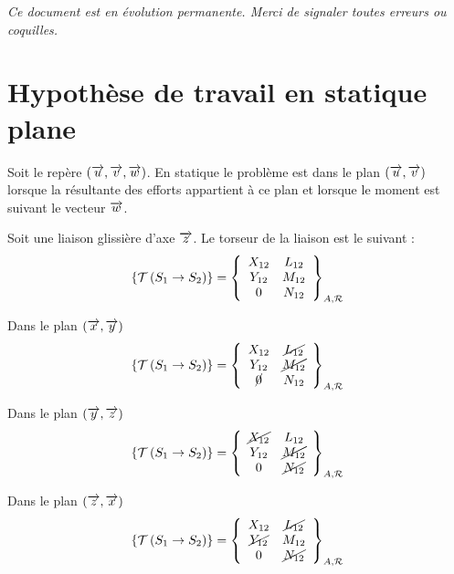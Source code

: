 \documentclass[10pt]{article}
\begin{document}
\setlength{\parskip}{0ex plus 0.2ex minus 0ex}
 \renewcommand{\contentsname}{}
 \renewcommand{\baselinestretch}{1}

\tableofcontents

 \renewcommand{\baselinestretch}{1.2}
\setlength{\parskip}{2ex plus 0.5ex minus 0.2ex}

\textit{Ce document est en évolution permanente. Merci de signaler toutes
erreurs ou coquilles.}

\section{Hypothèse de travail en statique plane}
\begin{defi}
Soit le repère $(\vect{u},\vect{v},\vect{w})$. En statique le problème est dans le plan $(\vect{u},\vect{v})$ lorsque la résultante des efforts appartient à ce plan et lorsque le moment est suivant le vecteur $\vect{w}$.
\end{defi}

\begin{exemple}
Soit une liaison glissière d'axe $\vect{z}$. Le torseur de la liaison est le suivant :
$$
\torseurstat{T}{S_1}{S_2}=
\torseurcol{X_{12}}{Y_{12}}{0}{L_{12}}{M_{12}}{N_{12}}{A,\mathcal{R}}
$$

\begin{minipage}[c]{.3\linewidth}
\begin{center}
Dans le plan $(\vect{x},\vect{y})$
$$
\torseurstat{T}{S_1}{S_2}=
\torseurcol{X_{12}}{Y_{12}}{\cancel{0}}{\cancel{L_{12}}}{\cancel{M_{12}}}{N_{12}}{A,\mathcal{R}}
$$
\end{center}
\end{minipage}\hfill
\begin{minipage}[c]{.3\linewidth}
\begin{center}
Dans le plan $(\vect{y},\vect{z})$
$$
\torseurstat{T}{S_1}{S_2}=
\torseurcol{\cancel{X_{12}}}{Y_{12}}{0}{L_{12}}{\cancel{M_{12}}}{\cancel{N_{12}}}{A,\mathcal{R}}
$$
\end{center}
\end{minipage}\hfill
\begin{minipage}[c]{.3\linewidth}
\begin{center}
Dans le plan $(\vect{z},\vect{x})$
$$
\torseurstat{T}{S_1}{S_2}=
\torseurcol{X_{12}}{\cancel{Y_{12}}}{0}{\cancel{L_{12}}}{M_{12}}{\cancel{N_{12}}}{A,\mathcal{R}}
$$
\end{center}
\end{minipage}

\end{exemple}
\end{document}
